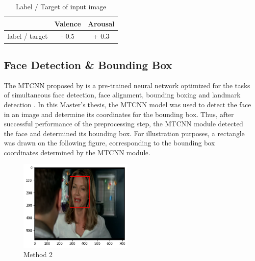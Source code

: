 \begin{table}[H]
\begin{center}
\begin{tabular}{@{}ccc@{}}
\toprule
 & Valence & Arousal \\ \midrule
\multicolumn{1}{r}{label / target} & - 0.5 & + 0.3 \\ \bottomrule
\end{tabular}
\caption{Label / Target of input image}
\label{tab:LabelTarget}
\end{center}
\end{table}


\subsection{Face Detection \& Bounding Box}
The \gls{MTCNN} proposed by \citet{Zhang:2016:MTCCN} is a pre-trained neural network optimized for the tasks of simultaneous face detection, face alignment, bounding boxing and landmark detection \citep{Brownlee:2019:VggFace2HowToFaceRec}.
\newline\newline
In this Master's thesis, the \gls{MTCNN} model was used to detect the face in an image and determine its coordinates for the bounding box. Thus, after successful performance of the preprocessing step, the \gls{MTCNN} module detected the face and determined its bounding box. For illustration purposes, a rectangle was drawn on the following figure, corresponding to the bounding box coordinates determined by the \gls{MTCNN} module.

\begin{center}
\begin{figure}[H]
  \begin{center}
  \includegraphics[angle=0, width=0.5\textwidth]{Figures/method_2.png}
  \caption{Method 2}
  \label{fig:MachineLearningModelMethod_2}
  \end{center}
\end{figure}
\end{center}

